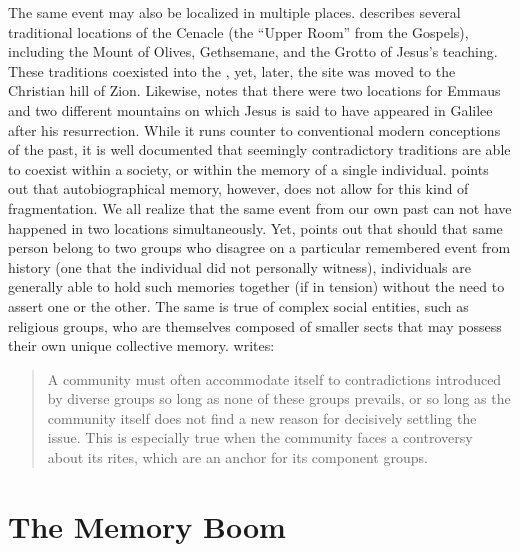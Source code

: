 The same event may also be localized in multiple places. \halbwachs describes several traditional locations of the Cenacle (the ``Upper Room'' from the Gospels), including the Mount of Olives, Gethsemane, and the Grotto of Jesus's teaching. These traditions coexisted into the , yet, later, the site was moved to the Christian hill of Zion. Likewise, \halbwachs notes that there were two locations for Emmaus and two different mountains on which Jesus is said to have appeared in Galilee after his resurrection. While it runs counter to conventional modern conceptions of the past, it is well documented that seemingly contradictory traditions are able to coexist within a society, or within the memory of a single individual.
\halbwachs points out that autobiographical memory, however, does not allow for this kind of fragmentation.
We all realize that the same event from our own past can not have happened in two locations simultaneously. Yet, \halbwachs points out that should that same person belong to two groups who disagree on a particular remembered event from history (one that the individual did not personally witness), individuals are generally able to hold such memories together (if in tension) without the need to assert one or the other. The same is true of complex social entities, such as religious groups, who are themselves composed of smaller sects that may possess their own unique collective memory. \halbwachs writes:  

\begin{quote}
    A community must often accommodate itself to contradictions introduced by diverse groups so long as none of these groups prevails, or so long as the community itself does not find a new reason for decisively settling the issue. This is especially true when the community faces a controversy about its rites, which are an anchor for its component groups.%
        \autocite[224]{halbwachs1992}
\end{quote} 


\section{The Memory Boom}

